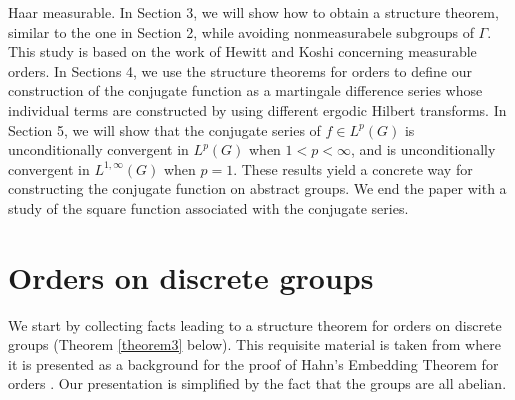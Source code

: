 Haar measurable.  
In Section 3, we will show how to obtain a structure
theorem, similar to the one in Section 2,
while avoiding nonmeasurabele subgroups of 
$\Gamma$.  This study is based on the work of Hewitt and Koshi 
\cite{hk} concerning measurable orders.
In Sections 4,
we use the structure theorems for orders 
to define our construction of the conjugate function
as a martingale difference series whose individual 
terms are constructed by using different ergodic Hilbert transforms.
In Section 5, we will show that the conjugate series of 
$f\in L^p(G)$ is unconditionally
convergent in $L^p(G)$ when $1<p<\infty$, 
and is unconditionally convergent in
$L^{1,\infty}(G)$ when $p=1$.
These results yield a concrete way for 
constructing the conjugate function
on abstract groups.
We end the paper with a study of the
square function associated with the conjugate series.


\section{Orders on discrete groups}
\newtheorem{theorem1}{Theorem}[section]
\newtheorem{archimedean}[theorem1]{Theorem}
\newtheorem{theorem2}[theorem1]{Theorem}
\newtheorem{remarks}[theorem1]{Definitions and Remarks}
\newtheorem{lemma1}[theorem1]{Lemma}
\newtheorem{convex-implies-pure}[theorem1]{Lemma}
\newtheorem{lemma2}[theorem1]{Lemma}
\newtheorem{theorem3}[theorem1]{Theorem}
\newtheorem{theorem4}[theorem1]{Theorem}
We start by collecting facts leading to a 
 structure theorem for orders on discrete groups
 (Theorem \ref{theorem3} below).  
 This requisite material is taken
 from \cite[Chapter IV]{fu} where it is presented 
 as a background for the proof of Hahn's
 Embedding Theorem for orders \cite[Theorem 16, p. 59]{fu}.
 Our presentation is simplified by the fact 
 that the groups are all abelian.  

